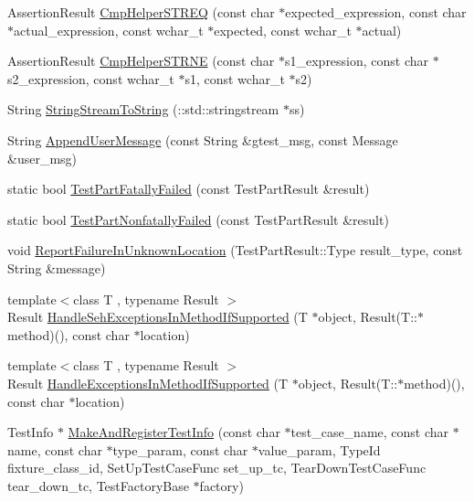\begin{DoxyCompactItemize}
\item 
\-Assertion\-Result \hyperlink{namespacetesting_1_1internal_a56283a915608e035442712d3b92a105b}{\-Cmp\-Helper\-S\-T\-R\-E\-Q} (const char $\ast$expected\-\_\-expression, const char $\ast$actual\-\_\-expression, const wchar\-\_\-t $\ast$expected, const wchar\-\_\-t $\ast$actual)
\item 
\-Assertion\-Result \hyperlink{namespacetesting_1_1internal_a7d89106441de99b36b0971c57caadc2d}{\-Cmp\-Helper\-S\-T\-R\-N\-E} (const char $\ast$s1\-\_\-expression, const char $\ast$s2\-\_\-expression, const wchar\-\_\-t $\ast$s1, const wchar\-\_\-t $\ast$s2)
\item 
\-String \hyperlink{namespacetesting_1_1internal_abf99dee8db2ca5a9bc512dd6cc34f048}{\-String\-Stream\-To\-String} (\-::std\-::stringstream $\ast$ss)
\item 
\-String \hyperlink{namespacetesting_1_1internal_a92cc3c0f16012ce7143a5c3256c00a29}{\-Append\-User\-Message} (const \-String \&gtest\-\_\-msg, const \-Message \&user\-\_\-msg)
\item 
static bool \hyperlink{namespacetesting_a88dd754d53baae013bf937f960e67306}{\-Test\-Part\-Fatally\-Failed} (const \-Test\-Part\-Result \&result)
\item 
static bool \hyperlink{namespacetesting_a650fdc14846c63608fb1c0810bf2b5ca}{\-Test\-Part\-Nonfatally\-Failed} (const \-Test\-Part\-Result \&result)
\item 
void \hyperlink{namespacetesting_1_1internal_a544a5c0a7bc19f664d434be72ecbdbfa}{\-Report\-Failure\-In\-Unknown\-Location} (\-Test\-Part\-Result\-::\-Type result\-\_\-type, const \-String \&message)
\item 
{\footnotesize template$<$class T , typename Result $>$ }\\\-Result \hyperlink{namespacetesting_1_1internal_ac7b1ac01c4703111210df6badab74591}{\-Handle\-Seh\-Exceptions\-In\-Method\-If\-Supported} (\-T $\ast$object, \-Result(\-T\-::$\ast$method)(), const char $\ast$location)
\item 
{\footnotesize template$<$class T , typename Result $>$ }\\\-Result \hyperlink{namespacetesting_1_1internal_a0034a1799f52bef77bb3b810af8b8969}{\-Handle\-Exceptions\-In\-Method\-If\-Supported} (\-T $\ast$object, \-Result(\-T\-::$\ast$method)(), const char $\ast$location)
\item 
\-Test\-Info $\ast$ \hyperlink{namespacetesting_1_1internal_a8f58f081cff056a35d18746667a16c4f}{\-Make\-And\-Register\-Test\-Info} (const char $\ast$test\-\_\-case\-\_\-name, const char $\ast$name, const char $\ast$type\-\_\-param, const char $\ast$value\-\_\-param, \-Type\-Id fixture\-\_\-class\-\_\-id, \-Set\-Up\-Test\-Case\-Func set\-\_\-up\-\_\-tc, \-Tear\-Down\-Test\-Case\-Func tear\-\_\-down\-\_\-tc, \-Test\-Factory\-Base $\ast$factory)

\end{DoxyCompactItemize}
